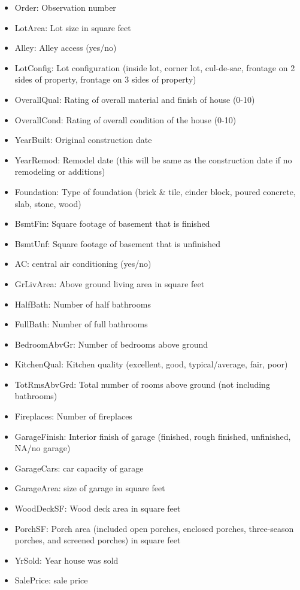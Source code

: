 \documentclass[]{article}
\begin{document}
\begin{itemize}
\item	Order: Observation number
\item LotArea: Lot size in square feet
\item Alley: Alley access (yes/no)
\item LotConfig: Lot configuration (inside lot, corner lot, cul-de-sac, frontage on 2 sides of
property, frontage on 3 sides of property)
\item OverallQual: Rating of overall material and finish of house (0-10)
\item OverallCond: Rating of overall condition of the house (0-10)
\item YearBuilt: Original construction date
\item YearRemod: Remodel date (this will be same as the construction date if no remodeling or
additions)
\item Foundation: Type of foundation (brick \& tile, cinder block, poured concrete, slab, stone,
wood)
\item BsmtFin: Square footage of basement that is finished
\item BsmtUnf: Square footage of basement that is unfinished
\item AC: central air conditioning (yes/no)
\item GrLivArea: Above ground living area in square feet
\item HalfBath: Number of half bathrooms
\item FullBath: Number of full bathrooms
\item BedroomAbvGr: Number of bedrooms above ground
\item KitchenQual: Kitchen quality (excellent, good, typical/average, fair, poor)
\item TotRmsAbvGrd: Total number of rooms above ground (not including bathrooms)
\item Fireplaces: Number of fireplaces
\item GarageFinish: Interior finish of garage (finished, rough finished, unfinished, NA/no
garage)
\item GarageCars: car capacity of garage
\item GarageArea: size of garage in square feet
\item  WoodDeckSF: Wood deck area in square feet
\item PorchSF: Porch area (included open porches, enclosed porches, three-season porches,
and screened porches) in square feet
\item YrSold: Year house was sold
\item SalePrice: sale price
	
	\end{itemize}
\end{document}
